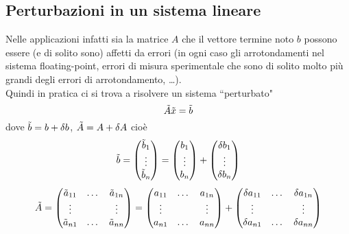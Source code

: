 \subsection{Perturbazioni in un sistema lineare}
Nelle applicazioni infatti sia la matrice $A$ che il vettore termine noto $b$ possono essere (e di solito sono) affetti da errori (in ogni caso gli arrotondamenti nel sistema floating-point, errori di misura sperimentale che sono di solito molto più grandi degli errori di arrotondamento, \dots).\\
Quindi in pratica ci si trova a risolvere un sistema ``perturbato"
\begin{equation*}
    \Tilde{A}\Tilde{x}=\Tilde{b}
\end{equation*}
dove $\Tilde{b}=b+\delta b$, $\Tilde{A}=A+\delta A$ cioè
\begin{equation*}
    \Tilde{b}= 
    \begin{pmatrix}
    \Tilde{b}_1\\  
    \vdots\\ 
    \Tilde{b}_n
\end{pmatrix} =
\begin{pmatrix}
    b_1\\  
    \vdots\\ 
    b_n
\end{pmatrix} + 
\begin{pmatrix}
    \delta b_1\\  
    \vdots\\ 
    \delta b_n
\end{pmatrix}
\end{equation*}
\begin{equation*}
    \Tilde{A} =
    \begin{pmatrix}
        \Tilde{a}_{11} & \dots & \Tilde{a}_{1n} \\
        \vdots & & \vdots \\
        \Tilde{a}_{n1} & \dots & \Tilde{a}_{nn}
    \end{pmatrix} = 
    \begin{pmatrix}
        a_{11} & \dots & a_{1n} \\
        \vdots & & \vdots  \\
        a_{n1} & \dots & a_{nn}
    \end{pmatrix} +
    \begin{pmatrix}
        \delta a_{11} & \dots & \delta a_{1n} \\
        \vdots & & \vdots \\
        \delta a_{n1} & \dots & \delta a_{nn}
    \end{pmatrix}
\end{equation*}
